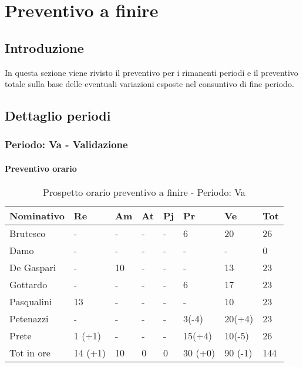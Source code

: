 \section {Preventivo a finire}
\label{preventivo_a_finire}
	\subsection {Introduzione}
	In questa sezione viene rivisto il preventivo per i rimanenti periodi e il preventivo totale sulla base delle eventuali variazioni esposte nel consuntivo di fine periodo.
	\subsection{Dettaglio periodi}
		\subsubsection {Periodo: Va - Validazione}
			\paragraph{Preventivo orario}\label{prev_finire_Va}
			\begin{table}[H] \begin{center} \begin{tabular}{llllllll}
										\toprule
										\textbf{Nominativo}	&	\textbf{Re}	&	\textbf{Am}	&	\textbf{At}	&	\textbf{Pj}	&	\textbf{Pr}	&	\textbf{Ve}	&	\textbf{Tot}	 \\
										\midrule
										Brutesco	&	-		&	-		&	-		&	-		&	6		&	20		&	26	\\
										Damo		&	-		&	-		&	-		&	-		&	-		&	-		&	0	\\
										De Gaspari	&	-		&	10		&	-		&	-		&	-		&	13		&	23	\\
										Gottardo	&	-		&	-		&	-		&	-		&	6		&	17		&	23	\\
										Pasqualini	&	13		&	-		&	-		&	-		&	-		&	10		&	23	\\
										Petenazzi	&	-		&	-		&	-		&	-		&	3(-4)	&	20(+4)	&	23	\\
										Prete		&	1	(+1)&	-		&	-		&	-		&	15(+4)	&	10(-5)	&	26	\\
										\midrule																					
										Tot in ore	&	14	(+1)&	10		&	0		&	0		&	30	(+0)&	90	(-1)&	144	\\
										
										\bottomrule
										\end{tabular} \end{center} \caption{Prospetto orario preventivo a finire - Periodo:
										Va
										}\end{table}

